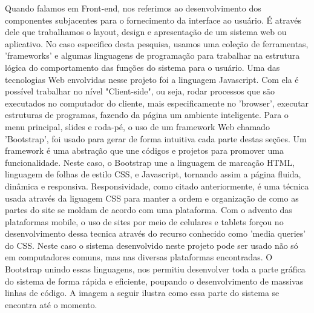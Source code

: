 Quando falamos em Front-end, nos referimos ao desenvolvimento dos componentes subjacentes para o fornecimento da interface ao usuário. É através dele que trabalhamos o layout, design e apresentação de um sistema web ou aplicativo. No caso especifico desta pesquisa, usamos uma coleção de ferramentas, 'frameworks' e algumas linguagens de programação para trabalhar na estrutura lógica do comportamento das funções do sistema para o usuário. Uma das tecnologias Web envolvidas nesse projeto foi a linguagem Javascript. Com ela é possível trabalhar no nível "Client-side", ou seja, rodar processos que são executados no computador do cliente, mais especificamente no 'browser', executar estruturas de programas, fazendo da página um ambiente inteligente.
Para o menu principal, slides e roda-pé, o uso de um framework Web chamado 'Bootstrap', foi usado para gerar de forma intuitiva cada parte destas seções. Um framework é uma abstração que une códigos e projetos para promover uma funcionalidade. Neste caso, o Bootstrap une a linguagem de marcação HTML, linguagem de folhas de estilo CSS, e Javascript, tornando assim a página fluida, dinâmica e responsiva. Responsividade, como citado anteriormente, é uma técnica usada através da liguagem CSS para manter a ordem e organização de como as partes do site se moldam de acordo com uma plataforma. Com o advento das plataformas mobile, o uso de sites por meio de celulares e tablets forçou no desenvolvimento dessa tecnica através do recurso conhecido como 'media queries' do CSS. Neste caso o sistema desenvolvido neste projeto pode ser usado não só em computadores comuns, mas nas diversas plataformas encontradas. O Bootstrap unindo essas linguagens, nos permitiu desenvolver toda a parte gráfica do sistema de forma rápida e eficiente, poupando o desenvolvimento de massivas linhas de código. A imagem a seguir ilustra como essa parte do sistema se encontra até o momento.

